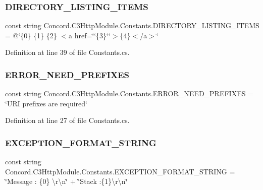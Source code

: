 \subsubsection{\texorpdfstring{DIRECTORY\_LISTING\_ITEMS}{DIRECTORY\_LISTING\_ITEMS}}
{\footnotesize\ttfamily const string Concord.\+C3\+Http\+Module.\+Constants.\+D\+I\+R\+E\+C\+T\+O\+R\+Y\+\_\+\+L\+I\+S\+T\+I\+N\+G\+\_\+\+I\+T\+E\+MS = @\char`\"{}\{0\} \{1\} \{2\} $<$a href=\char`\"{}\char`\"{}\{3\}\char`\"{}\char`\"{}$>$\{4\}$<$/a$>$\char`\"{}}



Definition at line 39 of file Constants.\+cs.

\mbox{\label{class_concord_1_1_c3_http_module_1_1_constants_a771df9956472c8100948a563e5b0f7cb}} 
\subsubsection{\texorpdfstring{ERROR\_NEED\_PREFIXES}{ERROR\_NEED\_PREFIXES}}
{\footnotesize\ttfamily const string Concord.\+C3\+Http\+Module.\+Constants.\+E\+R\+R\+O\+R\+\_\+\+N\+E\+E\+D\+\_\+\+P\+R\+E\+F\+I\+X\+ES = \char`\"{}U\+RI prefixes are required\char`\"{}}



Definition at line 27 of file Constants.\+cs.

\mbox{\label{class_concord_1_1_c3_http_module_1_1_constants_a7b6aed72af3256e1fce0da27a30c3120}} 
\subsubsection{\texorpdfstring{EXCEPTION\_FORMAT\_STRING}{EXCEPTION\_FORMAT\_STRING}}
{\footnotesize\ttfamily const string Concord.\+C3\+Http\+Module.\+Constants.\+E\+X\+C\+E\+P\+T\+I\+O\+N\+\_\+\+F\+O\+R\+M\+A\+T\+\_\+\+S\+T\+R\+I\+NG = \char`\"{}Message \+: \{0\} \textbackslash{}r\textbackslash{}n\char`\"{} + \char`\"{}Stack \+:\{1\}\textbackslash{}r\textbackslash{}n\char`\"{}}



